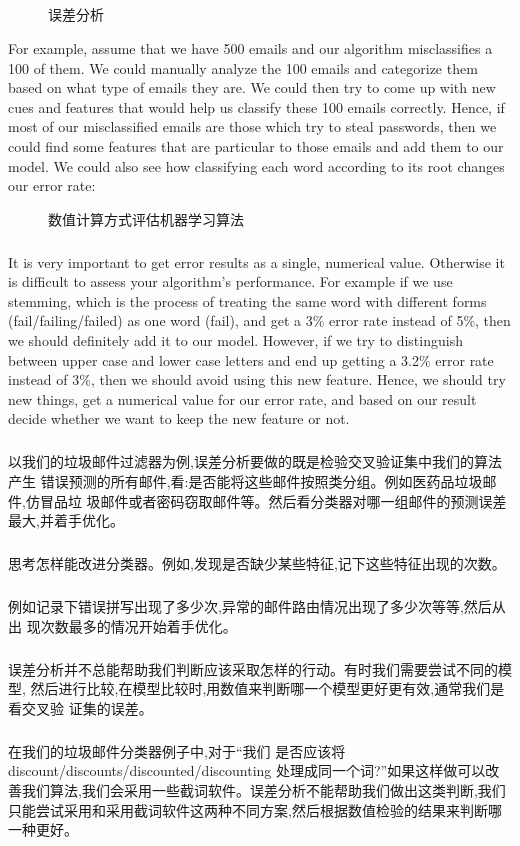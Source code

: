 \documentclass{article}
\begin{document}
\begin{CJK}{UTF8}{gbsn}
\subparagraph{}
\begin{figure}[H]
\label{fig:675}
\caption{误差分析}
\end{figure}
For example, assume that we have 500 emails and our algorithm misclassifies a 100 of them. We could manually analyze the 100 emails and categorize them based on what type of emails they are. We could then try to come up with new cues and features that would help us classify these 100 emails correctly. Hence, if most of our misclassified emails are those which try to steal passwords, then we could find some features that are particular to those emails and add them to our model. We could also see how classifying each word according to its root changes our error rate:
\begin{figure}[H]
\label{fig:673}
\caption{数值计算方式评估机器学习算法}
\end{figure}
\subparagraph{}
It is very important to get error results as a single, numerical value. Otherwise it is difficult to assess your algorithm's performance. For example if we use stemming, which is the process of treating the same word with different forms (fail/failing/failed) as one word (fail), and get a 3\%{} error rate instead of 5\%{}, then we should definitely add it to our model. However, if we try to distinguish between upper case and lower case letters and end up getting a 3.2\%{} error rate instead of 3\%{}, then we should avoid using this new feature. Hence, we should try new things, get a numerical value for our error rate, and based on our result decide whether we want to keep the new feature or not. 
\subparagraph{}
以我们的垃圾邮件过滤器为例,误差分析要做的既是检验交叉验证集中我们的算法产生
错误预测的所有邮件,看:是否能将这些邮件按照类分组。例如医药品垃圾邮件,仿冒品垃
圾邮件或者密码窃取邮件等。然后看分类器对哪一组邮件的预测误差最大,并着手优化。
\subparagraph{}
思考怎样能改进分类器。例如,发现是否缺少某些特征,记下这些特征出现的次数。
\subparagraph{}
例如记录下错误拼写出现了多少次,异常的邮件路由情况出现了多少次等等,然后从出
现次数最多的情况开始着手优化。
\subparagraph{}
误差分析并不总能帮助我们判断应该采取怎样的行动。有时我们需要尝试不同的模型,
然后进行比较,在模型比较时,用数值来判断哪一个模型更好更有效,通常我们是看交叉验
证集的误差。
\begin{figure}[H]
\label{fig:681}
\end{figure}
\subparagraph{}
在我们的垃圾邮件分类器例子中,对于“我们 是否应该将discount/discounts/discounted/discounting 处理成同一个词?”如果这样做可以改善我们算法,我们会采用一些截词软件。误差分析不能帮助我们做出这类判断,我们只能尝试采用和采用截词软件这两种不同方案,然后根据数值检验的结果来判断哪一种更好。

\end{CJK}
\end{document}
